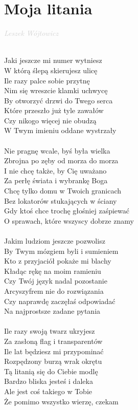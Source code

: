 \documentclass[a5paper, 10pt]{book}
\begin{document}
\newpage
\section{Moja litania}\textcolor{lightgray}{\textit{Leszek Wójtowicz}}\\~\\
\begin{minipage}[t]{0.8\textwidth}
Jaki jeszcze mi numer wytniesz\\
W którą ślepą skierujesz ulicę\\
Ile razy palce sobie przytnę\\
Nim się wreszcie klamki uchwycę\\
By otworzyć drzwi do Twego serca\\
Które przeszło już tyle zawałów\\
Czy nikogo więcej nie obudzą\\
W Twym imieniu oddane wystrzały\\
\\
\hspace*{5mm}Nie pragnę wcale, byś była wielka\\
\hspace*{5mm}Zbrojna po zęby od morza do morza\\
\hspace*{5mm}I nie chcę także, by Cię uważano\\
\hspace*{5mm}Za perłę świata i wybrankę Boga\\
\hspace*{5mm}Chcę tylko domu w Twoich granicach\\
\hspace*{5mm}Bez lokatorów stukających w ściany\\
\hspace*{5mm}Gdy ktoś chce trochę głośniej zaśpiewać\\
\hspace*{5mm}O sprawach, które wszyscy dobrze znamy\\
\\
Jakim ludziom jeszcze pozwolisz\\
By Twym mózgiem byli i sumieniem\\
Kto z przyjaciół pokaże mi blachy\\
Kładąc rękę na moim ramieniu\\
Czy Twój język nadal pozostanie\\
Arcyszyfrem nie do rozwiązania\\
Czy naprawdę zaczęłaś odpowiadać\\
Na najprostsze zadane pytania\\
\\
Ile razy swoją twarz ukryjesz\\
Za zasłoną flag i transparentów\\
Ile lat będziesz mi przypominać\\
Rozpędzony burzą wrak okrętu\\
Tą litanią się do Ciebie modlę\\
Bardzo bliska jesteś i daleka\\
Ale jest coś takiego w Tobie\\
Że pomimo wszystko wierzę, czekam\\
\end{minipage}
\end{document}
